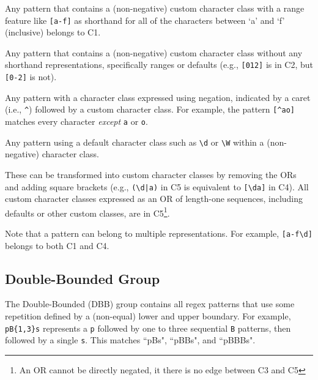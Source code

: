 \begin{description}  \itemsep -1pt
\item[C1:] Any pattern that contains a (non-negative) custom character class with  a range feature like \verb![a-f]! as shorthand for all of the characters between `a' and `f' (inclusive) belongs to  C1.


\item[C2:] Any pattern that contains a (non-negative) custom character class  without any shorthand representations, specifically ranges or defaults (e.g., \verb![012]! is in C2, but \verb![0-2]! is not).


\item[C3:] Any pattern with a character class expressed using negation, indicated by a caret (i.e., \verb!^!) followed by a custom character class.
For example, the pattern \verb![^ao]! matches every character \emph{except} \verb!a! or \verb!o!. 


\item[C4:]Any pattern using a default character class such as \verb!\d! or \verb!\W! within a (non-negative) character class. %

\item[C5:]  These can be transformed into custom character classes by removing the ORs and adding square brackets (e.g., \verb!(\d|a)! in C5 is equivalent to \verb![\da]! in C4). All custom character classes expressed as an OR of length-one sequences, including defaults or other custom classes, are in C5\footnote{An OR cannot be directly negated, it there is no edge between C3 and C5}. 
\end{description}

Note that a pattern can belong to multiple representations. For example,  \verb![a-f\d]! belongs to both C1 and C4.  

\subsection{Double-Bounded Group}
The Double-Bounded (DBB) group contains all regex patterns that use some repetition defined by a (non-equal) lower and upper boundary.  For example,  \verb!pB{1,3}s! represents a \verb!p! followed by one to three sequential \verb!B! patterns, then followed by a single \verb!s!.  This matches ``pBs", ``pBBs", and ``pBBBs".


